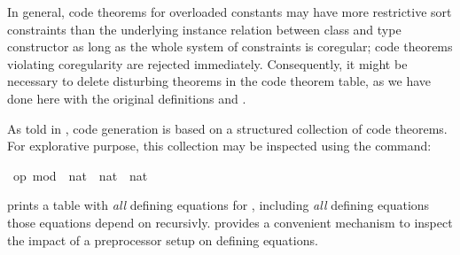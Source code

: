 \begin{isabellebody}
\begin{isamarkuptext}%
%
\end{isamarkuptext}%
\isamarkuptrue%
%
\begin{isamarkuptext}%
In general, code theorems for overloaded constants may have more
  restrictive sort constraints than the underlying instance relation
  between class and type constructor as long as the whole system of
  constraints is coregular; code theorems violating coregularity
  are rejected immediately.  Consequently, it might be necessary
  to delete disturbing theorems in the code theorem table,
  as we have done here with the original definitions 
  and .%
\end{isamarkuptext}%
\isamarkuptrue%
%
\isamarkuptrue%
%
\begin{isamarkuptext}%
As told in , code generation is based
  on a structured collection of code theorems.
  For explorative purpose, this collection
  may be inspected using the \isa{{\isasymCODETHMS}} command:%
\end{isamarkuptext}%
\isamarkuptrue%
\isamarkupfalse%
\ {\isachardoublequoteopen}op\ mod\ {\isacharcolon}{\isacharcolon}\ nat\ {\isasymRightarrow}\ nat\ {\isasymRightarrow}\ nat{\isachardoublequoteclose}%
\begin{isamarkuptext}%
\noindent prints a table with \emph{all} defining equations
  for , including
  \emph{all} defining equations those equations depend
  on recursivly.  \isa{{\isasymCODETHMS}} provides a convenient
  mechanism to inspect the impact of a preprocessor setup
  on defining equations.
  

\end{isamarkuptext}
\end{isabellebody}
